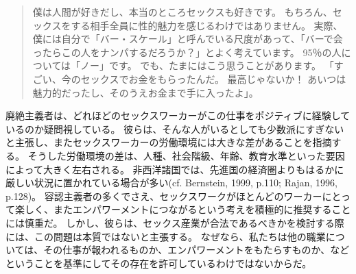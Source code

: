 \documentclass[paper=a4,book,openany]{jlreq}
\newcommand{\ig}[1]{}           %
\begin{document}
\begin{quote}
僕は人間が好きだし、本当のところセックスも好きです。
もちろん、セックスをする相手全員に性的魅力を感じるわけではありません。
実際、僕には自分で「バー・スケール」と呼んでいる尺度があって、「バーで会ったらこの人をナンパするだろうか？」とよく考えています。
95％の人については「ノー」です。
でも、たまにはこう思うことがあります。
「すごい、今のセックスでお金をもらったんだ。
最高じゃないか！ あいつは魅力的だったし、そのうえお金まで手に入ったよ」。
\citep[p.11]{curtis19:_we_are_naked_waitr_who_deliv_sex}
\end{quote}

廃絶主義者は、どれほどのセックスワーカーがこの仕事をポジティブに経験しているのか疑問視している。
彼らは、そんな人がいるとしても少数派にすぎないと主張し、またセックスワーカーの労働環境には大きな差があることを指摘する。
そうした労働環境の差は、人種、社会階級、年齢、教育水準といった要因によって大きく左右される。
非西洋諸国では、先進国の経済圏よりもはるかに厳しい状況に置かれている場合が多い(cf. Bernstein, 1999, p.110; Rajan, 1996, p.128)。
\ig{Elizabeth Bernstein}\nocite{bernstein99:_whats_wrong_prost}\nocite{rajan96:_prost_quest}
容認主義者の多くでさえ、セックスワークがほとんどのワーカーにとって楽しく、またエンパワーメントにつながるという考えを積極的に推奨することには慎重だ。
しかし、彼らは、セックス産業が合法であるべきかを検討する際には、この問題は本質ではないと主張する。
なぜなら、私たちは他の職業については、その仕事が報われるものか、エンパワーメントをもたらすものか、などということを基準にしてその存在を許可しているわけではないからだ。
\end{document}
